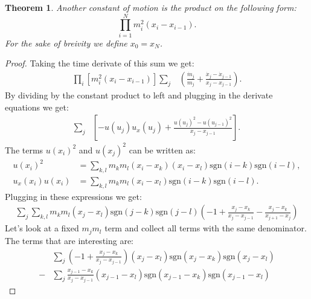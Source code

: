 \documentclass[english,master]{liumaiex}
\theoremstyle{plain}
\newtheorem{theorem}[proposition]{Theorem}
\theoremstyle{definition}
\newcommand{\sgn}{\text{sgn}}
\begin{document}
\begin{theorem}
	Another constant of motion is the product on the following form:	
	\begin{equation}
		\prod_{i=1}^{N} m_i^2 (x_i - x_{i-1}).
	\end{equation}
	For the sake of breivity we define $x_0 = x_N$.
\end{theorem}
\begin{proof}
	Taking the time derivate of this sum we get:
	\begin{equation}
	\begin{aligned}
		\prod_i [m_i^2 (x_i - x_{i-1})]
		\sum_j & (\frac{\dot{m}_j}{m_j} + \frac{\dot{x}_j - \dot{x}_{j-1}}{x_j - x_{j-1}}).
	\end{aligned}
	\end{equation}
	By dividing by the constant product to left and plugging in the derivate equations we get:
	\begin{equation}
	\begin{aligned}
		\sum_j & [-u(u_j)u_x(u_j) + \frac{u(u_j)^2 - u(u_{j-1})^2}{x_j - x_{j-1}}].
	\end{aligned}
	\end{equation}
	The terms $u(x_i)^2$ and $u(x_j)^2$ can be written as:
	\begin{align}
		u(x_i)^2 &= \sum_{k,l} m_k m_l (x_i - x_k) (x_i - x_l) \sgn(i - k) \sgn(i - l), \\
		u_x(x_i) u(x_i) &= \sum_{k,l} m_k m_l (x_i - x_l) \sgn(i - k) \sgn(i - l).
	\end{align}
	Plugging in these expressions we get:
	\begin{equation}
	\begin{aligned}
		\sum_{j} \sum_{k,l} m_k m_l (x_j - x_l) \sgn(j - k) \sgn(j - l)
		(-1 + \frac{x_j - x_k}{x_j - x_{j-1}} - \frac{x_j - x_k}{x_{j+1} - x_j})
	\end{aligned}
	\end{equation}
	Let's look at a fixed $m_jm_l$ term and collect all terms with the same denominator. The terms that are interesting are:
	\begin{equation}
	\begin{aligned}
		&\sum_{j} (-1 + \frac{x_j - x_k}{x_j - x_{j-1}}) (x_j - x_l) \sgn(x_j - x_k) \sgn(x_j - x_l)\\
		-&\sum_{j} \frac{x_{j-1} - x_k}{x_j - x_{j-1}} (x_{j-1} - x_l) \sgn(x_{j-1} - x_k) \sgn(x_{j-1} - x_l) 
	\end{aligned}
	\end{equation}
\end{proof}
\end{document}
